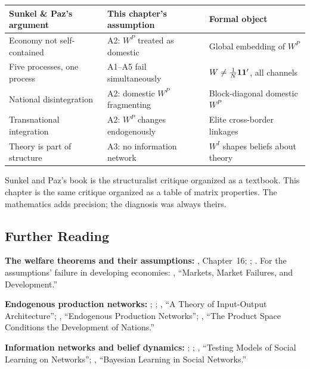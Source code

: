 \documentclass[../structural_economics_book.tex]{subfiles}
\begin{document}
\begin{center}
\begin{tabularx}{\textwidth}{LLL}
\toprule
\textbf{Sunkel \& Paz's argument} & \textbf{This chapter's assumption} & \textbf{Formal object} \\
\midrule
Economy not self-contained & A2: $W^P$ treated as domestic & Global embedding of $W^P$ \\
Five processes, one process & A1--A5 fail simultaneously & $W \neq \frac{1}{N}\mathbf{1}\mathbf{1}'$, all channels \\
National disintegration & A2: domestic $W^P$ fragmenting & Block-diagonal domestic $W^P$ \\
Transnational integration & A2: $W^P$ changes endogenously & Elite cross-border linkages \\
Theory is part of structure & A3: no information network & $W^I$ shapes beliefs about theory \\
\bottomrule
\end{tabularx}
\end{center}

Sunkel and Paz's book is the structuralist critique organized as a textbook. This chapter is the same critique organized as a table of matrix properties. The mathematics adds precision; the diagnosis was always theirs.


\subsection*{Further Reading}

\textbf{The welfare theorems and their assumptions:} \citet{mascolell1995microeconomic}, Chapter~16; \citet{debreu1959theory}; \citet{arrow1951extension}. For the assumptions' failure in developing economies: \citet{stiglitz1989markets}, ``Markets, Market Failures, and Development.''

\textbf{Endogenous production networks:} \citet{acemoglu2012network}; \citet{baqaee2019macroeconomic}; \citet{oberfield2018theory}, ``A Theory of Input-Output Architecture''; \citet{acemoglu2020endogenous}, ``Endogenous Production Networks''; \citet{hidalgo2007product}, ``The Product Space Conditions the Development of Nations.''

\textbf{Information networks and belief dynamics:} \citet{degroot1974reaching}; \citet{golub2010naive}; \citet{chandrasekhar2020testing}, ``Testing Models of Social Learning on Networks''; \citet{acemoglu2011bayesian}, ``Bayesian Learning in Social Networks.''
\end{document}
